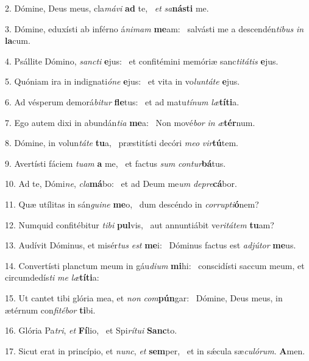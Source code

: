 2. Dómine, Deus meus, cla\textit{má}\textit{vi} \textbf{ad} te, \ast\  \textit{et} \textit{sa}\textbf{nás}\textbf{ti} me.\

3. Dómine, eduxísti ab inférno á\textit{ni}\textit{mam} \textbf{me}am: \ast\  salvásti me a descendén\textit{ti}\textit{bus} \textit{in} \textbf{la}cum.\

4. Psállite Dómino, \textit{sanc}\textit{ti} \textbf{e}jus: \ast\  et confitémini memóriæ sanc\textit{ti}\textit{tá}\textit{tis} \textbf{e}jus.\

5. Quóniam ira in indignati\textit{ó}\textit{ne} \textbf{e}jus: \ast\  et vita in vo\textit{lun}\textit{tá}\textit{te} \textbf{e}jus.\

6. Ad vésperum demorá\textit{bi}\textit{tur} \textbf{fle}tus: \ast\  et ad matu\textit{tí}\textit{num} \textit{læ}\textbf{tí}\textbf{ti}a.\

7. Ego autem dixi in abundán\textit{ti}\textit{a} \textbf{me}a: \ast\  Non mové\textit{bor} \textit{in} \textit{æ}\textbf{tér}num.\

8. Dómine, in volun\textit{tá}\textit{te} \textbf{tu}a, \ast\  præstitísti decóri \textit{me}\textit{o} \textit{vir}\textbf{tú}tem.\

9. Avertísti fáciem \textit{tu}\textit{am} \textbf{a} me, \ast\  et factus \textit{sum} \textit{con}\textit{tur}\textbf{bá}tus.\

10. Ad te, Dómi\textit{ne}, \textit{cla}\textbf{má}bo: \ast\  et ad Deum me\textit{um} \textit{de}\textit{pre}\textbf{cá}bor.\

11. Quæ utílitas in sán\textit{gui}\textit{ne} \textbf{me}o, \ast\  dum descéndo in \textit{cor}\textit{rup}\textit{ti}\textbf{ó}nem?\

12. Numquid confitébitur \textit{ti}\textit{bi} \textbf{pul}vis, \ast\  aut annuntiábit ve\textit{ri}\textit{tá}\textit{tem} \textbf{tu}am?\

13. Audívit Dóminus, et misér\textit{tus} \textit{est} \textbf{me}i: \ast\  Dóminus factus est \textit{ad}\textit{jú}\textit{tor} \textbf{me}us.\

14. Convertísti planctum meum in gáu\textit{di}\textit{um} \textbf{mi}hi: \ast\  conscidísti saccum meum, et circumdedís\textit{ti} \textit{me} \textit{læ}\textbf{tí}\textbf{ti}a:\

15. Ut cantet tibi glória mea, et \textit{non} \textit{com}\textbf{pún}gar: \ast\  Dómine, Deus meus, in ætérnum con\textit{fi}\textit{té}\textit{bor} \textbf{ti}bi.\

16. Glória Pa\textit{tri}, \textit{et} \textbf{Fí}lio, \ast\  et Spi\textit{rí}\textit{tu}\textit{i} \textbf{Sanc}to.\

17. Sicut erat in princípio, et \textit{nunc}, \textit{et} \textbf{sem}per, \ast\  et in sǽcula sæ\textit{cu}\textit{ló}\textit{rum}. \textbf{A}men.\

